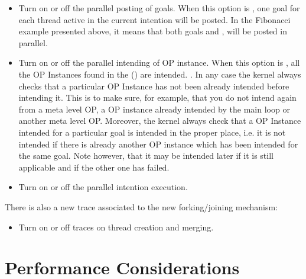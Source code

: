 \begin{itemize}

\item {} Turn on or off the parallel posting of goals.
When this option is , one goal for each thread active in the current
intention will be posted. In the Fibonacci example presented above, it means
that both goals  and , will be posted in parallel.

\item {} Turn on or off the parallel intending of
OP instance. When this option is , all the OP Instances found in the
 () are intended.
. In any case the kernel always checks that a particular
OP Instance has not been already intended before intending it. This is to make
sure, for example, that you do not intend again from a meta level OP, a OP
instance already intended by the main loop or another meta level OP. Moreover,
the kernel always check that a OP Instance intended for a particular goal is
intended in the proper place, i.e. it is not intended if there is already
another OP instance which has been intended for the same goal. Note however,
that it may be intended later if it is still applicable and if the other one
has failed.

\item {} Turn on or off the parallel
intention execution.

\end{itemize}

There is also a new trace associated to the new forking/joining mechanism:

\begin{itemize}

\item {} Turn on or off traces on thread creation and
merging.

\end{itemize}

\section{Performance Considerations}

